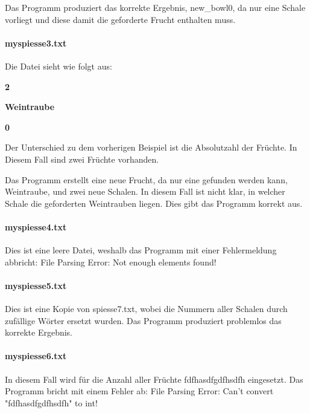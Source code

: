 \documentclass[a4paper,10pt,ngerman]{scrartcl}
\begin{document}
Das Programm produziert das korrekte Ergebnis, new\_bowl0, da nur eine Schale vorliegt und diese damit die geforderte Frucht enthalten muss.

\paragraph{myspiesse3.txt}
Die Datei sieht wie folgt aus:

\textbf{2}

\textbf{Weintraube}

\textbf{0}

Der Unterschied zu dem vorherigen Beispiel ist die Absolutzahl der Früchte.
In Diesem Fall sind zwei Früchte vorhanden.

Das Programm erstellt eine neue Frucht, da nur eine gefunden werden kann, Weintraube, und zwei neue Schalen.
In diesem Fall ist nicht klar, in welcher Schale die geforderten Weintrauben liegen.
Dies gibt das Programm korrekt aus.

\paragraph{myspiesse4.txt}
Dies ist eine leere Datei, weshalb das Programm mit einer Fehlermeldung abbricht: \glqq File Parsing Error: Not enough elements found!\grqq{}

\paragraph{myspiesse5.txt}
Dies ist eine Kopie von spiesse7.txt, wobei die Nummern aller Schalen durch zufällige Wörter ersetzt wurden.
Das Programm produziert problemlos das korrekte Ergebnis.

\paragraph{myspiesse6.txt}
In diesem Fall wird für die Anzahl aller Früchte \glqq fdfhasdfgdfhsdfh\grqq{} eingesetzt.
Das Programm bricht mit einem Fehler ab: \glqq File Parsing Error: Can't convert "fdfhasdfgdfhsdfh" to int!\grqq{}
\end{document}
